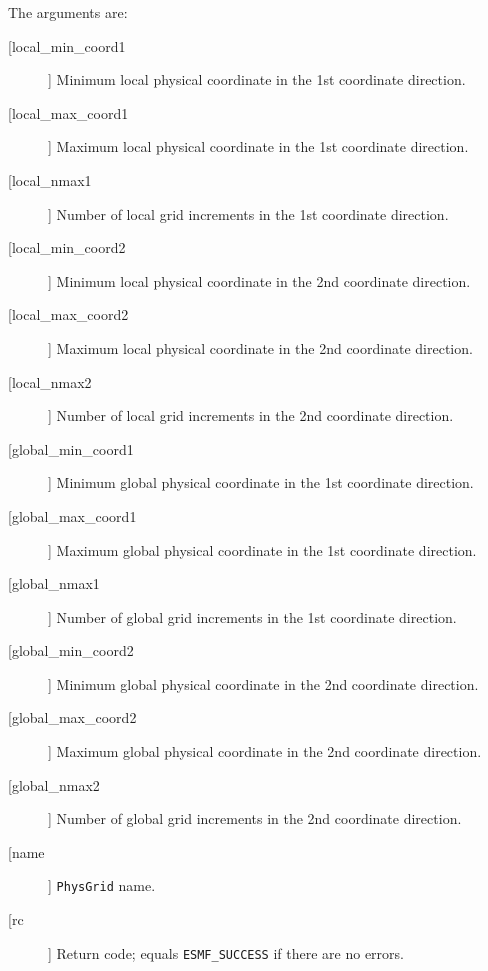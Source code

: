        The arguments are:
       \begin{description}
       \item[[local\_min\_coord1]]
            Minimum local physical coordinate in the 1st coordinate direction.
       \item[[local\_max\_coord1]]
            Maximum local physical coordinate in the 1st coordinate direction.
       \item[[local\_nmax1]]
            Number of local grid increments in the 1st coordinate direction.
       \item[[local\_min\_coord2]]
            Minimum local physical coordinate in the 2nd coordinate direction.
       \item[[local\_max\_coord2]]
            Maximum local physical coordinate in the 2nd coordinate direction.
       \item[[local\_nmax2]]
            Number of local grid increments in the 2nd coordinate direction.
       \item[[global\_min\_coord1]]
            Minimum global physical coordinate in the 1st coordinate direction.
       \item[[global\_max\_coord1]]
            Maximum global physical coordinate in the 1st coordinate direction.
       \item[[global\_nmax1]]
            Number of global grid increments in the 1st coordinate direction.
       \item[[global\_min\_coord2]]
            Minimum global physical coordinate in the 2nd coordinate direction.
       \item[[global\_max\_coord2]]
            Maximum global physical coordinate in the 2nd coordinate direction.
       \item[[global\_nmax2]]
            Number of global grid increments in the 2nd coordinate direction.
       \item[[name]]
            {\tt PhysGrid} name.
       \item[[rc]] 
            Return code; equals {\tt ESMF\_SUCCESS} if there are no errors.
     \end{description}
  
\begin{verbatim} \end{verbatim}
 
 
\mbox{}\hrulefill\ 
 
